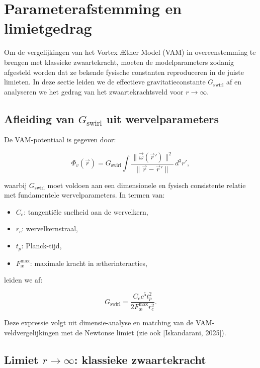 \section{Parameterafstemming en limietgedrag}\label{sec:appendix_6}

Om de vergelijkingen van het Vortex Æther Model (VAM) in overeenstemming te brengen met klassieke zwaartekracht, moeten de modelparameters zodanig afgesteld worden dat ze bekende fysische constanten reproduceren in de juiste limieten. In deze sectie leiden we de effectieve gravitatieconstante $G_\text{swirl}$ af en analyseren we het gedrag van het zwaartekrachtsveld voor $r \to \infty$.

\subsection{Afleiding van $G_\text{swirl}$ uit wervelparameters}

De VAM-potentiaal is gegeven door:

\begin{equation}
\Phi_v(\vec{r}) = G_\text{swirl} \int \frac{\|\vec{\omega}(\vec{r}')\|^2}{\|\vec{r} - \vec{r}'\|} \, d^3r',
\end{equation}

waarbij $G_\text{swirl}$ moet voldoen aan een dimensionele en fysisch consistente relatie met fundamentele wervelparameters. In termen van:

\begin{itemize}
  \item $C_e$: tangentiële snelheid aan de wervelkern,
  \item $r_c$: wervelkernstraal,
  \item $t_p$: Planck-tijd,
  \item $F^{\text{max}}_{\text{\ae}}$: maximale kracht in ætherinteracties,
\end{itemize}

leiden we af:

\begin{equation}
G_\text{swirl} = \frac{C_e c^5 t_p^2}{2 F^{\text{max}}_{\text{\ae}} r_c^2}.
\end{equation}

Deze expressie volgt uit dimensie-analyse en matching van de VAM-veldvergelijkingen met de Newtonse limiet (zie ook [Iskandarani, 2025]).

\subsection{Limiet $r \to \infty$: klassieke zwaartekracht}


